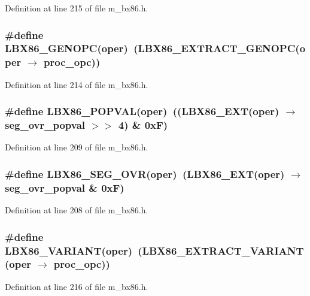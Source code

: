 Definition at line 215 of file m\_\-bx86.h.
\subsubsection{\setlength{\rightskip}{0pt plus 5cm}\#define LBX86\_\-GENOPC(oper)~(LBX86\_\-EXTRACT\_\-GENOPC(oper $\rightarrow$ proc\_\-opc))}\label{m__bx86_8h_5522396fda153471b506a3809dd7b968}




Definition at line 214 of file m\_\-bx86.h.
\subsubsection{\setlength{\rightskip}{0pt plus 5cm}\#define LBX86\_\-POPVAL(oper)~((LBX86\_\-EXT(oper) $\rightarrow$ seg\_\-ovr\_\-popval $>$$>$ 4) \& 0x\-F)}\label{m__bx86_8h_f63ebe0c3ef0f5eda6523a0a2fd1befd}




Definition at line 209 of file m\_\-bx86.h.
\subsubsection{\setlength{\rightskip}{0pt plus 5cm}\#define LBX86\_\-SEG\_\-OVR(oper)~(LBX86\_\-EXT(oper) $\rightarrow$ seg\_\-ovr\_\-popval \& 0x\-F)}\label{m__bx86_8h_eeb9836ec8ccef4b8aa82db75059f72d}




Definition at line 208 of file m\_\-bx86.h.
\subsubsection{\setlength{\rightskip}{0pt plus 5cm}\#define LBX86\_\-VARIANT(oper)~(LBX86\_\-EXTRACT\_\-VARIANT(oper $\rightarrow$ proc\_\-opc))}\label{m__bx86_8h_01a1795a65ff444d10105aa216417a8c}




Definition at line 216 of file m\_\-bx86.h.
